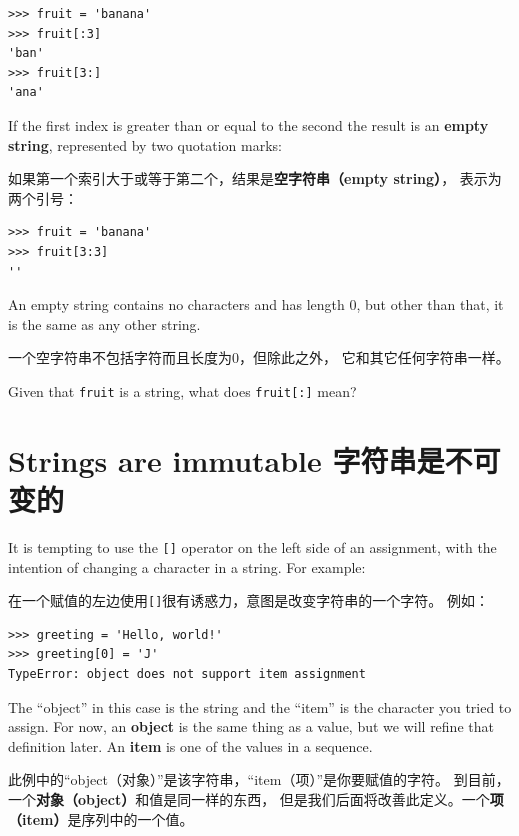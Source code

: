 \documentclass[10pt]{book}
\begin{document}
\begin{CJK}{UTF8}{gbsn}
\begin{verbatim}
>>> fruit = 'banana'
>>> fruit[:3]
'ban'
>>> fruit[3:]
'ana'
\end{verbatim}
%
If the first index is greater than or equal to the second the result
is an {\bf empty string}, represented by two quotation marks:

如果第一个索引大于或等于第二个，结果是{\bf 空字符串（empty string）}，
表示为两个引号：

\begin{verbatim}
>>> fruit = 'banana'
>>> fruit[3:3]
''
\end{verbatim}
%
An empty string contains no characters and has length 0, but other
than that, it is the same as any other string.

一个空字符串不包括字符而且长度为0，但除此之外，
它和其它任何字符串一样。

\begin{exercise}

Given that {\tt fruit} is a string, what does
{\tt fruit[:]} mean?

\end{exercise}


\section{Strings are immutable 字符串是不可变的}

It is tempting to use the {\tt []} operator on the left side of an
assignment, with the intention of changing a character in a string.
For example:

在一个赋值的左边使用{\tt []}很有诱惑力，意图是改变字符串的一个字符。
例如：

\begin{verbatim}
>>> greeting = 'Hello, world!'
>>> greeting[0] = 'J'
TypeError: object does not support item assignment
\end{verbatim}
%
The ``object'' in this case is the string and the ``item'' is
the character you tried to assign.  For now, an {\bf object} is
the same thing as a value, but we will refine that definition
later.  An {\bf item} is one of the values in a sequence.

此例中的``object（对象）''是该字符串，``item（项）''是你要赋值的字符。
到目前，一个{\bf 对象（object）}和值是同一样的东西，
但是我们后面将改善此定义。一个{\bf 项（item）}是序列中的一个值。


\end{CJK}
\end{document}
